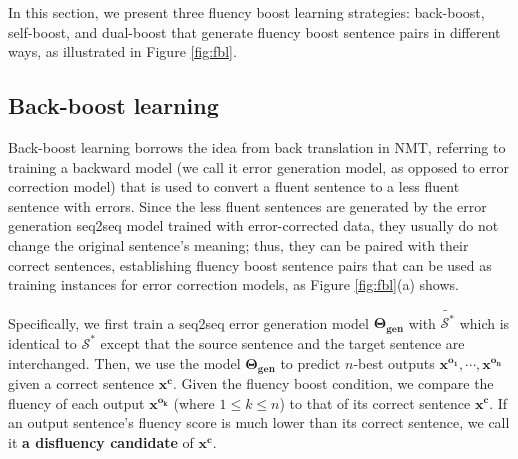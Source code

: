 \documentclass{article} %
\begin{document}

In this section, we present three fluency boost learning strategies: back-boost, self-boost, and dual-boost that generate fluency boost sentence pairs in different ways, as illustrated in Figure \ref{fig:fbl}.

\subsection{Back-boost learning}\label{subsec:backboost}

Back-boost learning borrows the idea from back translation \citep{sennrich2016improving} in NMT, referring to training a backward model (we call it error generation model, as opposed to error correction model) that is used to convert a fluent sentence to a less fluent sentence with errors. Since the less fluent sentences are generated by the error generation seq2seq model trained with error-corrected data, they usually do not change the original sentence's meaning; thus, they can be paired with their correct sentences, establishing fluency boost sentence pairs that can be used as training instances for error correction models, as Figure \ref{fig:fbl}(a) shows.

Specifically, we first train a seq2seq error generation model $\boldsymbol{\Theta_{gen}}$ with $\widetilde{\mathcal{S}^*}$ which is identical to $\mathcal{S}^*$ except that the source sentence and the target sentence are interchanged. Then, we use the model $\boldsymbol{\Theta_{gen}}$ to predict $n$-best outputs $\boldsymbol{x^{o_1}, \cdots, x^{o_n}}$ given a correct sentence $\boldsymbol{x^c}$. Given the fluency boost condition, we compare the fluency of each output $\boldsymbol{x^{o_k}}$ (where $1 \le k \le n$) to that of its correct sentence $\boldsymbol{x^c}$. If an output sentence's fluency score is much lower than its correct sentence, we call it \textbf{a disfluency candidate} of $\boldsymbol{x^c}$.
\end{document}

